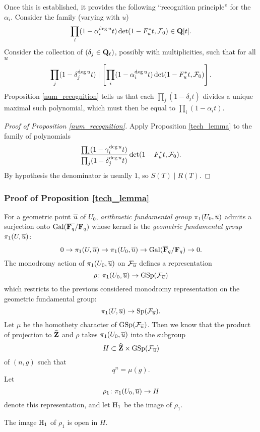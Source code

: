Once this is established, it provides the following ``recognition principle'' for the $\alpha_i$. Consider the family (varying with $u$)
\[
\prod_i (1-\alpha_i^{\deg u} t) \det (1-F_u^* t, \mathcal{F}_0) \in \mathbf{Q}[t].
\]
Consider the collection of $(\delta_j \in \mathbf{Q}_{\ell})$, possibly with multiplicities, such that for all $u$ 
\[
\prod_j (1-\delta_j^{\deg u} t)  \mid \left[ \prod_i (1-\alpha_i^{\deg u} t) \det (1-F_u^* t, \mathcal{F}_0) \right].
\]
Proposition \ref{num_recognition} tells us that each $\prod_j (1-\delta_j t)  $ divides a unique maximal such polynomial, which must then be equal to $\prod_i (1-\alpha_i t) $. 

\begin{proof}[Proof of Proposition \ref{num_recognition}]
Apply Proposition \ref{tech_lemma} to the family of polynomials
\[
\frac{\prod_i (1-\gamma_i^{\deg u} t)}{\prod_j (1-\delta_j^{\deg u} t)} \det(1-F_u^* t, \mathcal{F}_0).
\]
By hypothesis the denominator is usually $1$, so $S(T) \mid R(T)$. 
\end{proof}

\subsubsection{Proof of Proposition \ref{tech_lemma}}

For a geometric point $\overline{u}$ of $U_0$, \emph{arithmetic fundamental group} $\pi_1(U_0, \overline{u})$ admits a surjection onto $\operatorname{Gal}(\overline{\mathbf{F}_q}/\mathbf{F}_q)$ whose kernel is the \emph{geometric fundamental group} $\pi_1(U, \overline{u})$: 
\[
0 \rightarrow \pi_1(U, \overline{u}) \rightarrow \pi_1(U_0, \overline{u}) \rightarrow \operatorname{Gal}(\overline{\mathbf{F}}_q/\mathbf{F}_q) \rightarrow 0.
\]
The monodromy action of $\pi_1(U_0, \overline{u})$ on $\mathcal{F}_{\overline{u}}$ defines a representation 
\[
\rho \colon \pi_1(U_0, \overline{u}) \rightarrow \mathrm{GSp}(\mathcal{F}_{\overline{u}})
\]
which restricts to the previous considered monodromy representation on the geometric fundamental group:
\[
\pi_1(U, \overline{u}) \rightarrow \mathrm{Sp}(\mathcal{F}_{\overline{u}}).
\]
Let $\mu$ be the homothety character of $\mathrm{GSp}(\mathcal{F}_{\overline{u}})$. Then we know that the product of projection to $\widehat{\mathbf{Z}}$ and $\rho$ takes $\pi_1(U_0, \overline{u})$ into the subgroup
\[
H \subset \widehat{\mathbf{Z}} \times \mathrm{GSp}(\mathcal{F}_{\overline{u}})
\]
of $(n, g)$ such that 
\[
q^n = \mu(g).
\]
Let 
\[
\rho_1 \colon \pi_1(U_0, \overline{u}) \rightarrow H
\]
denote this representation, and let $\mathrm{H}_1$ be the image of $\rho_1$. 

\begin{lem}
The image $\mathrm{H}_1$ of $\rho_1$ is open in $H$. 
\end{lem}


